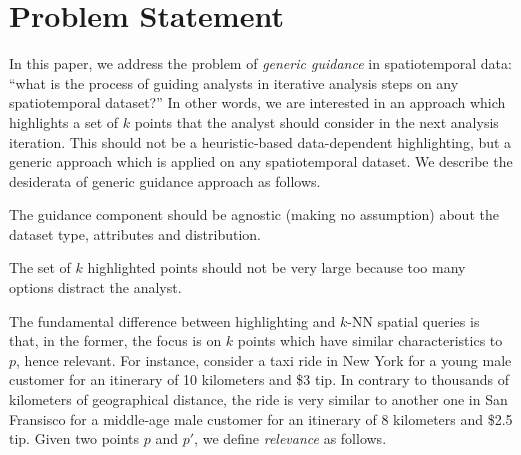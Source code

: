 \section{Problem Statement}
\label{sec:pb}

In this paper, we address the problem of {\em generic guidance} in spatiotemporal data: ``what is the process of guiding analysts in iterative analysis steps on any spatiotemporal dataset?'' In other words, we are interested in an approach which highlights a set of $k$ points that the analyst should consider in the next analysis iteration. This should not be a heuristic-based data-dependent highlighting, but a generic approach which is applied on any spatiotemporal dataset. We describe the desiderata of generic guidance approach as follows.

\vspace{5pt}
 The guidance component should be agnostic (making no assumption) about the dataset type, attributes and distribution.

\vspace{5pt}
 The set of $k$ highlighted points should not be very large because too many options distract the analyst. %

\vspace{5pt}
 The fundamental difference between highlighting and $k$-NN spatial queries \cite{aly2015spatial} is that, in the former, the focus is on $k$ points which have similar characteristics to $p$, hence relevant.
For instance, consider a taxi ride in New York for a young male customer for an itinerary of 10 kilometers and \$3 tip. In contrary to thousands of kilometers of geographical distance, the ride is very similar to another one in San Fransisco for a middle-age male customer for an itinerary of 8 kilometers and \$2.5 tip.
Given two points $p$ and $p'$, we define {\em relevance} as follows.

